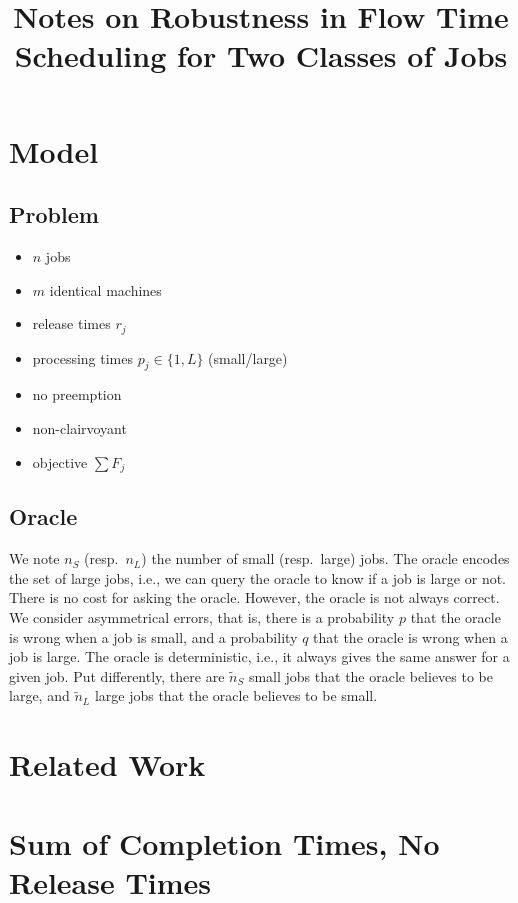 \documentclass{article}
\title{Notes on Robustness in Flow Time Scheduling for Two Classes of Jobs}
\begin{document}
\maketitle

\section{Model}

\subsection{Problem}

\begin{itemize}
    \item \(n\) jobs
    \item \(m\) identical machines
    \item release times \(r_j\)
    \item processing times \(p_j\in\{1,L\}\) (small/large)
    \item no preemption
    \item non-clairvoyant
    \item objective \(\sum F_j\)
\end{itemize}

\subsection{Oracle}

We note \(n_S\) (resp.\ \(n_L\)) the number of small (resp.\ large) jobs. The oracle encodes the set
of large jobs, i.e., we can query the oracle to know if a job is large or not. There is no cost for
asking the oracle. However, the oracle is not always correct. We consider asymmetrical errors, that
is, there is a probability \(p\) that the oracle is wrong when a job is small, and a probability
\(q\) that the oracle is wrong when a job is large. The oracle is deterministic, i.e., it always
gives the same answer for a given job. Put differently, there are \(\tilde{n}_S\) small jobs that
the oracle believes to be large, and \(\tilde{n}_L\) large jobs that the oracle believes to be
small.

\section{Related Work}

\section{Sum of Completion Times, No Release Times}
\end{document}
